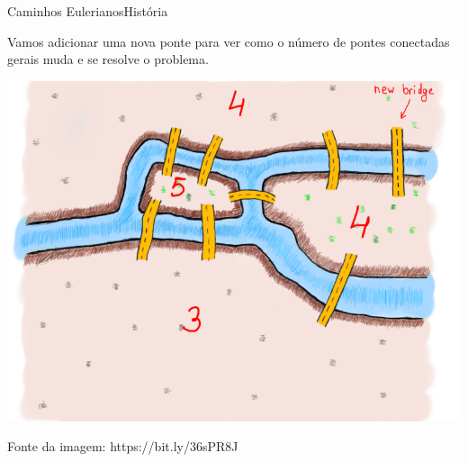 \documentclass[t]{beamer}
\begin{document}
\begin{ftst}{Caminhos Eulerianos}{História}

Vamos adicionar uma nova ponte para ver como o número de pontes conectadas gerais muda e se resolve o problema.

\centering
\includegraphics[scale=0.28]{Figuras/euleriano_6.png}

\justifying
\tiny
Fonte da imagem: \hypertarget{clique aqui.}{https://bit.ly/36sPR8J}
\end{ftst}

\end{document}
